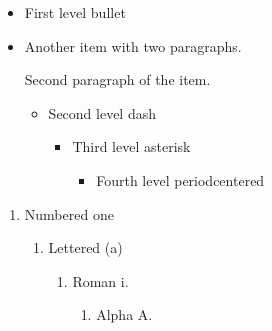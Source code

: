 \documentclass[10pt]{article}
\begin{document}
\begin{itemize}
  \item First level bullet
  \item Another item with two paragraphs.

    Second paragraph of the item.
  \begin{itemize}
    \item Second level dash
    \begin{itemize}
      \item Third level asterisk
      \begin{itemize}
        \item Fourth level periodcentered
      \end{itemize}
    \end{itemize}
  \end{itemize}
\end{itemize}
\begin{enumerate}
  \item Numbered one
  \begin{enumerate}
    \item Lettered (a)
    \begin{enumerate}
      \item Roman i.
      \begin{enumerate}
        \item Alpha A.
      \end{enumerate}
    \end{enumerate}
  \end{enumerate}
\end{enumerate}
\end{document}
